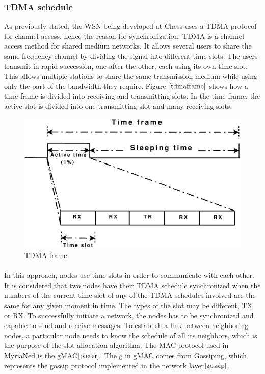 \documentclass[a4paper,10pt]{report}
\begin{document}
\subsubsection{TDMA schedule}
As previously stated, the WSN being developed at Chess uses a TDMA protocol for channel access, hence the reason for synchronization.
TDMA is a channel access method for shared medium networks. It allows several users to share the same frequency
channel by dividing the signal into different time slots. The users transmit in rapid succession, one after the other, each using its
own time slot. This allows multiple stations to share the same transmission medium while using only the part of the bandwidth they
require. Figure $\ref{tdmaframe}$ shows how a time frame is divided into receiving and transmitting slots. In the time frame, the active slot is divided into one transmitting slot and many receiving slots.
\begin{figure}
\centering
\includegraphics[width=0.5 \textwidth]{tdmaframe}
\caption{TDMA frame} \label{tdmaframe}
\end{figure}
\paragraph*{} 
In this approach, nodes use time slots in order to communicate with each other. It is considered that two nodes have
their TDMA schedule synchronized when the numbers of the current time slot of any of the TDMA schedules involved are the same for any
given moment in time. The types of the slot may be different, TX or RX. To successfully initiate a network, the nodes has to be
synchronized and capable to send and receive messages. To establish a link between neighboring nodes, a particular node needs to know
the schedule of all its neighbors, which is the purpose of the slot allocation algorithm. The MAC protocol used in MyriaNed is the gMAC$\cite{pieter}$. The g in gMAC comes from Gossiping, which represents the gossip protocol implemented in the network layer$\cite{gossip}$.
\end{document}
